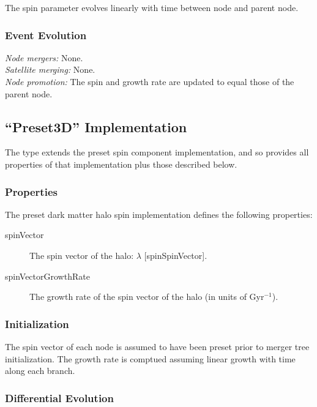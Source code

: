The spin parameter evolves linearly with time between \gls{node} and parent node.

\subsubsection{Event Evolution}

\noindent\emph{Node mergers:} None.\\

\noindent\emph{Satellite merging:} None.\\

\noindent\emph{Node promotion:} The spin and growth rate are updated to equal those of the parent node.\\

\subsection{``Preset3D'' Implementation}

The type extends the {\normalfont \ttfamily preset} spin component implementation, and so provides all properties of that implementation plus those described below.

\subsubsection{Properties}

The preset dark matter halo spin implementation defines the following properties:
\begin{description}
 \item [{\normalfont \ttfamily spinVector}] The spin vector of the halo: $\lambda$ [{\normalfont \ttfamily spinSpinVector}].
 \item [{\normalfont \ttfamily spinVectorGrowthRate}] The growth rate of the spin vector of the halo (in units of Gyr$^{-1}$).
\end{description}

\subsubsection{Initialization}

The spin vector of each \gls{node} is assumed to have been preset prior to merger tree initialization. The growth rate is comptued assuming linear growth with time along each branch.

\subsubsection{Differential Evolution}

